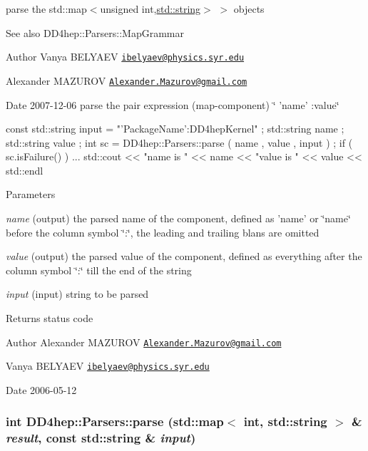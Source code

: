parse the {\ttfamily std::map$<$unsigned int,\hyperlink{classstd_1_1string}{std::string}$>$ $>$} objects \begin{DoxySeeAlso}{See also}
DD4hep::Parsers::MapGrammar 
\end{DoxySeeAlso}
\begin{DoxyAuthor}{Author}
Vanya BELYAEV \href{mailto:ibelyaev@physics.syr.edu}{\tt ibelyaev@physics.syr.edu} 

Alexander MAZUROV \href{mailto:Alexander.Mazurov@gmail.com}{\tt Alexander.Mazurov@gmail.com} 
\end{DoxyAuthor}
\begin{DoxyDate}{Date}
2007-\/12-\/06 parse the pair expression (map-\/component) \char`\"{} 'name' :value\char`\"{} 
\begin{DoxyCode}
  const std::string input = "'PackageName':DD4hepKernel" ;
  std::string name  ;
  std::string value ;
  int sc = DD4hep::Parsers::parse ( name , value , input ) ;
  if ( sc.isFailure() ) { ... }
  std::cout <<  "\tParsed name  is " << name
            <<  "\tParsed value is " << value << std::endl
\end{DoxyCode}

\end{DoxyDate}

\begin{DoxyParams}{Parameters}
\item[{\em name}](output) the parsed name of the component, defined as 'name' or \char`\"{}name\char`\"{} before the column symbol \char`\"{}:\char`\"{}, the leading and trailing blans are omitted \item[{\em value}](output) the parsed value of the component, defined as everything after the column symbol \char`\"{}:\char`\"{} till the end of the string \item[{\em input}](input) string to be parsed \end{DoxyParams}
\begin{DoxyReturn}{Returns}
status code
\end{DoxyReturn}
\begin{DoxyAuthor}{Author}
Alexander MAZUROV \href{mailto:Alexander.Mazurov@gmail.com}{\tt Alexander.Mazurov@gmail.com} 

Vanya BELYAEV \href{mailto:ibelyaev@physics.syr.edu}{\tt ibelyaev@physics.syr.edu} 
\end{DoxyAuthor}
\begin{DoxyDate}{Date}
2006-\/05-\/12 
\end{DoxyDate}
\hypertarget{namespace_d_d4hep_1_1_parsers_a3d922ac85001241814312a94a6ccdbc3}{
\subsubsection[{parse}]{\setlength{\rightskip}{0pt plus 5cm}int DD4hep::Parsers::parse (std::map$<$ int, std::string $>$ \& {\em result}, \/  const std::string \& {\em input})}}
\label{namespace_d_d4hep_1_1_parsers_a3d922ac85001241814312a94a6ccdbc3}


